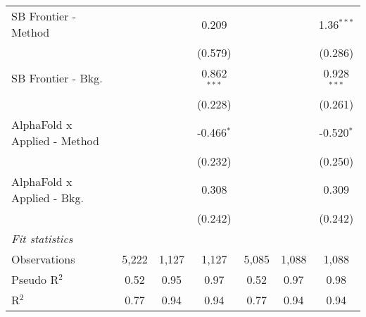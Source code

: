 \begin{tabular}{lcccccc}
   SB Frontier - Method         &                &               & 0.209         &                &               & 1.36$^{***}$\\   
                                &                &               & (0.579)       &                &               & (0.286)\\   
   SB Frontier - Bkg.           &                &               & 0.862$^{***}$ &                &               & 0.928$^{***}$\\   
                                &                &               & (0.228)       &                &               & (0.261)\\   
   AlphaFold x Applied - Method &                &               & -0.466$^{*}$  &                &               & -0.520$^{*}$\\   
                                &                &               & (0.232)       &                &               & (0.250)\\   
   AlphaFold x Applied - Bkg.   &                &               & 0.308         &                &               & 0.309\\   
                                &                &               & (0.242)       &                &               & (0.242)\\   
   \midrule
   \emph{Fit statistics}\\
   Observations                 & 5,222          & 1,127         & 1,127         & 5,085          & 1,088         & 1,088\\  
   Pseudo R$^2$                 & 0.52           & 0.95          & 0.97          & 0.52           & 0.97          & 0.98\\  
   R$^2$                        & 0.77           & 0.94          & 0.94          & 0.77           & 0.94          & 0.94\\  
   

\end{tabular}
